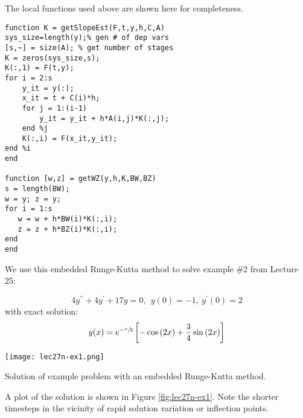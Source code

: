 The local functions used above are shown here for completeness.
\begin{lstlisting}[style=myMatlab,name=lec27n-1]
function K = getSlopeEst(F,t,y,h,C,A)
sys_size=length(y);% gen # of dep vars
[s,~] = size(A); % get number of stages
K = zeros(sys_size,s);
K(:,1) = F(t,y);
for i = 2:s
    y_it = y(:);
    x_it = t + C(i)*h;
    for j = 1:(i-1)
        y_it = y_it + h*A(i,j)*K(:,j);
    end %j    
    K(:,i) = F(x_it,y_it);
end %i
end

function [w,z] = getWZ(y,h,K,BW,BZ)
s = length(BW);
w = y; z = y;
for i = 1:s
   w = w + h*BW(i)*K(:,i);
   z = z + h*BZ(i)*K(:,i);
end
end
\end{lstlisting}
We use this embedded Runge-Kutta method to solve example \#2 from Lecture 25:

\begin{equation*}
4y^{\prime \prime}+4y^{\prime} + 17y=0, \ \ y(0)=-1, \ y^{\prime}(0)=2
\end{equation*}
with exact solution:
\begin{equation*}
y(x)=e^{-\sfrac{x}{2}}\left[-\cos{(2x)}+\frac{3}{4}\sin{(2x)} \right]
\end{equation*}
\begin{marginfigure}
\texttt{[image: lec27n-ex1.png]}
\caption{Solution of example problem with an embedded Runge-Kutta method.}
\label{fig:lec27n-ex1}
\end{marginfigure}
A plot of the solution is shown in Figure \ref{fig:lec27n-ex1}.  Note the shorter timesteps in the vicinity of rapid solution variation or inflection points.
